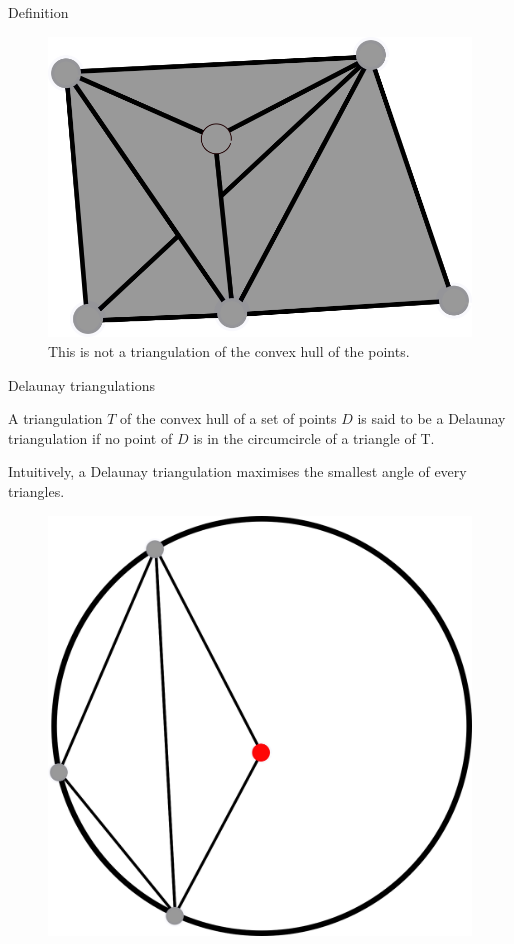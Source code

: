\documentclass[18pt]{beamer}
\begin{document}
\begin{frame}{Definition}
\begin{overprint}
\begin{figure}
  \centering
  \includegraphics[scale=1.5]{NotTrig2}
  \caption{\label{NotTrig1} This is not a triangulation of the convex hull of the points.}
\end{figure}
\end{overprint}
\end{frame}

\begin{frame}{Delaunay triangulations}
 
 \begin{definition}
  A triangulation $T$ of the convex hull of a set of points $D$ is said to be a Delaunay triangulation if no point of $D$ is in the circumcircle of a triangle of T.
 \end{definition}
Intuitively, a Delaunay triangulation maximises the smallest angle of every triangles.
 \begin{figure}
\centering
\includegraphics[scale=0.8]{dessin2}
\end{figure}
\end{frame}
\end{document}
